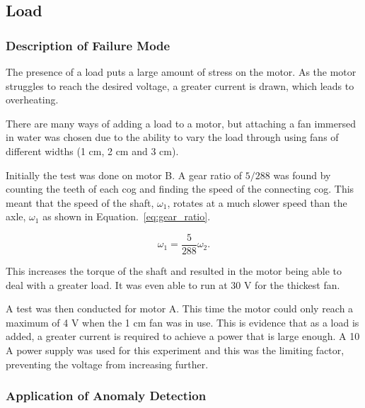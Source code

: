 \subsection{Load}

\subsubsection{Description of Failure Mode}
The presence of a load puts a large amount of stress on the motor. As the motor struggles to reach the desired voltage, a greater current is drawn, which leads to overheating.
        
There are many ways of adding a load to a motor, but attaching a fan immersed in water was chosen due to the ability to vary the load through using fans of different widths (1 cm, 2 cm and 3 cm).
    
Initially the test was done on motor B. A gear ratio of ${5}/{288}$ was found by counting the teeth of each cog and finding the speed of the connecting cog. This meant that the speed of the shaft, $\omega_1$, rotates at a much slower speed than the axle, $\omega _1$ as shown in Equation.~\eqref{eq:gear_ratio}.

\begin{equation}
\omega_1 = \frac{5}{288} \omega_2.
\label{eq:gear_ratio}
\end{equation}

This increases the torque of the shaft and resulted in the motor being able to deal with a greater load. It was even able to run at 30 V for the thickest fan.

A test was then conducted for motor A. This time the motor could only reach a maximum of 4 V when the 1 cm fan was in use. This is evidence that as a load is added, a greater current is required to achieve a power that is large enough. A 10 A power supply was used for this experiment and this was the limiting factor, preventing the voltage from increasing further.

\subsubsection{Application of Anomaly Detection}

